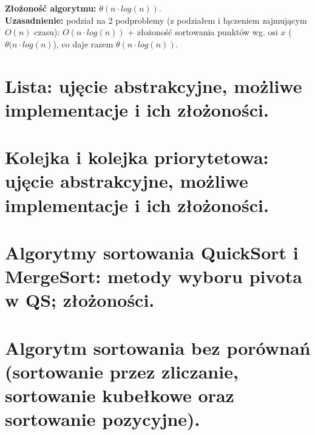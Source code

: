 \documentclass[12pt]{article}
\begin{document}
\begin{enumerate}
\begin{enumerate}
\begin{center}

                \end{center}
            \end{enumerate}
        \end{enumerate}
        \[\] 
        \textbf{Złożoność algorytmu:} $\theta(n \cdot log(n))$. \[\] 
        \textbf{Uzasadnienie:} podział na 2 podproblemy (z podziałem i łączeniem zajmującym 
        $O(n)$ czasu): $O(n \cdot log(n))$ + złożoność sortowania punktów wg. osi $x$ 
        ($\theta(n \cdot log(n)$), co daje razem $\theta(n \cdot log(n))$.
    \newpage

    \section{Lista: ujęcie abstrakcyjne, możliwe implementacje i ich złożoności.}
    \section{Kolejka i kolejka priorytetowa: ujęcie abstrakcyjne, możliwe implementacje i ich złożoności.}
    \section{Algorytmy sortowania QuickSort i MergeSort: metody wyboru pivota w QS; złożoności.}
    \section{Algorytm sortowania bez porównań (sortowanie przez zliczanie, sortowanie kubełkowe oraz sortowanie pozycyjne).}
\end{document}
